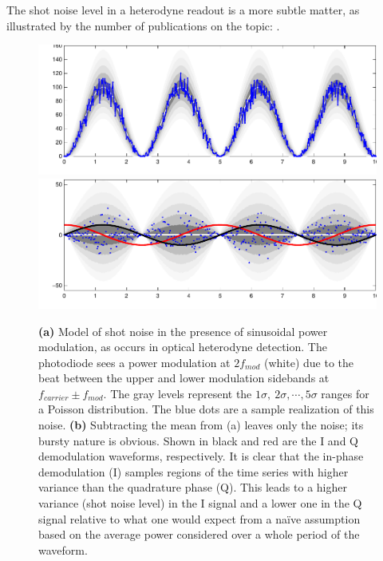 The shot noise level in a heterodyne readout is a more subtle matter,
as illustrated by the number of publications on the topic:
\cite{Niebauer1991Nonstationary, Lyons2000Shot, Mio1992Observation, Meers1991Modulation}.

\begin{figure}
\includegraphics[width=\columnwidth]{figures/cyclostationary-timeseries.pdf}
\includegraphics[width=\columnwidth]{figures/cyclostationary-timeseries2.pdf}
\caption{\label{fig:cyclostationary-shot-noise} \textbf{(a)} Model of
  shot noise in the presence of sinusoidal power modulation, as occurs
  in optical heterodyne detection.  The photodiode sees a power
  modulation at $2f_{mod}$ (white) due to the beat between the upper
  and lower modulation sidebands at $f_{carrier} \pm f_{mod}$.
  The gray levels represent the $1\sigma,\ 2\sigma,
  \cdots, 5\sigma$ ranges for a Poisson distribution.  The blue dots
  are a sample realization of this noise. \textbf{(b)} Subtracting the
  mean from (a) leaves only the noise; its bursty nature is obvious.
  Shown in black and red are the I and Q demodulation waveforms,
  respectively.  It is clear that the in-phase demodulation (I)
  samples regions of the time series with higher variance than the
  quadrature phase (Q).  This leads to a higher variance (shot noise
  level) in the I signal and a lower one in the Q signal relative to
  what one would expect from a na\"ive assumption based on the average
  power considered over a whole period of the waveform.}
\end{figure}

